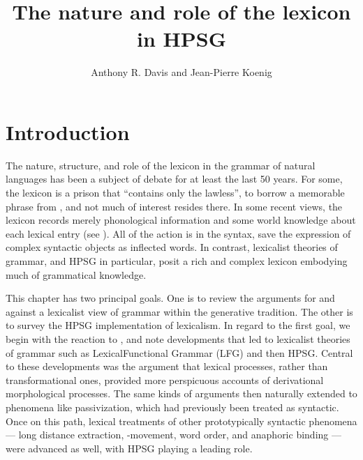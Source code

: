 \documentclass[output=paper,biblatex,babelshorthands,newtxmath,draftmode,colorlinks,citecolor=brown]{langscibook}
\author{Anthony R. Davis\orcid{0000-0003-2873-9555}\affiliation{Southern Oregon University} and Jean-Pierre Koenig\orcid{0000-0002-5431-5978}\affiliation{University at Buffalo}}
\title{The nature and role of the lexicon in HPSG}
\begin{document}
\maketitle
\label{chap-lexicon}

\section{Introduction}

The nature, structure, and role of the lexicon in the grammar of natural languages has been a
subject of debate for at least the last 50 years. For some, the lexicon is a prison that ``contains
only the lawless'', to borrow a memorable phrase from , and not
much of interest resides there. In some recent views, the lexicon records merely phonological
information and some world knowledge about each lexical entry (see \citealt{Marantz1997}). All of
the action is in the syntax, save the expression of complex syntactic objects as inflected words.
In contrast, lexicalist theories of grammar, and HPSG in particular, posit a rich and complex
lexicon embodying much of grammatical knowledge.

This chapter has two principal goals.  One is to review the arguments for and against a lexicalist
view of grammar within the generative tradition.  The other is to survey the HPSG implementation of
lexicalism. In regard to the first goal, we begin with the reaction to ,
and note developments that led to lexicalist theories of grammar such as Lexical\indexlfg Functional
Grammar (LFG) and then HPSG.  Central to these developments was the argument that lexical processes,
rather than transformational ones, provided more perspicuous accounts of derivational morphological
processes.  The same kinds of arguments then naturally extended to phenomena like
passivization, which had previously been treated as syntactic.  Once on this path,
lexical treatments of other prototypically syntactic phenomena — long distance extraction,
-movement, word order, and anaphoric binding — were advanced as well, with HPSG playing a
leading role.
\end{document}
